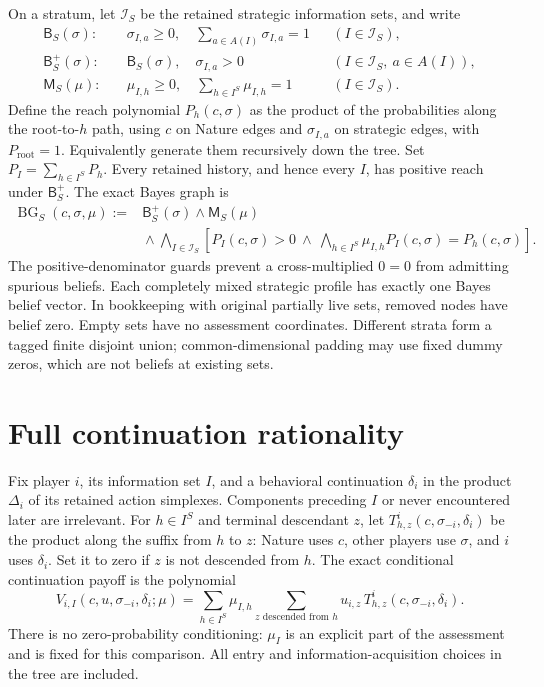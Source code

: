 \documentclass[11pt,a4paper]{article}
\numberwithin{equation}{section}
\theoremstyle{definition}
\DeclareMathOperator{\BG}{BG}
\begin{document}
On a stratum, let \(\mathcal I_S\) be the retained strategic information
sets, and write
\begin{align*}
 \mathsf B_S(\sigma):\quad&
   \sigma_{I,a}\ge0,\quad\sum_{a\in A(I)}\sigma_{I,a}=1
                    &&(I\in\mathcal I_S),\\
 \mathsf B_S^+(\sigma):\quad&
   \mathsf B_S(\sigma),\quad \sigma_{I,a}>0
                    &&(I\in\mathcal I_S,\ a\in A(I)),\\
 \mathsf M_S(\mu):\quad&
   \mu_{I,h}\ge0,\quad\sum_{h\in I^S}\mu_{I,h}=1
                    &&(I\in\mathcal I_S).
\end{align*}
Define the reach polynomial \(P_h(c,\sigma)\) as the product of
the probabilities along the root-to-\(h\) path, using \(c\) on Nature
edges and \(\sigma_{I,a}\) on strategic edges, with \(P_{\mathrm{root}}=1\).
Equivalently generate them recursively down the tree.
Set \(P_I=\sum_{h\in I^S}P_h\).
Every retained history, and hence every \(I\), has positive reach under
\(\mathsf B_S^+\). The exact Bayes graph is
\begin{equation}\label{eq:Bayes}
 \begin{split}
 \BG_S(c,\sigma,\mu):={}&
 \mathsf B_S^+(\sigma)\wedge\mathsf M_S(\mu)\\
 &{}\wedge\bigwedge_{I\in\mathcal I_S}
   \left[P_I(c,\sigma)>0\ \wedge\
    \bigwedge_{h\in I^S}\mu_{I,h}P_I(c,\sigma)=P_h(c,\sigma)\right].
 \end{split}
\end{equation}
The positive-denominator guards prevent a cross-multiplied \(0=0\)
from admitting spurious beliefs.
Each completely mixed strategic profile has exactly one Bayes belief
vector. In bookkeeping with original partially live sets, removed
nodes have belief zero. Empty sets have no assessment coordinates.
Different strata form a tagged finite disjoint union; common-dimensional
padding may use fixed dummy zeros, which are not beliefs at existing sets.

\section{Full continuation rationality}\label{sec:SR}
Fix player \(i\), its information set \(I\), and a behavioral continuation
\(\delta_i\) in the product \(\Delta_i\) of its retained action simplexes.
Components preceding \(I\) or never encountered later are irrelevant.
For \(h\in I^S\) and terminal descendant \(z\), let
\(T^i_{h,z}(c,\sigma_{-i},\delta_i)\) be the product along the suffix
from \(h\) to \(z\): Nature uses \(c\), other players use \(\sigma\),
and \(i\) uses \(\delta_i\).
Set it to zero if \(z\) is not descended from \(h\).
The exact conditional continuation payoff is the polynomial
\begin{equation}\label{eq:continuation}
 V_{i,I}(c,u,\sigma_{-i},\delta_i;\mu)
 =\sum_{h\in I^S}\mu_{I,h}
      \sum_{z\text{ descended from }h}
           u_{i,z}\,T^i_{h,z}(c,\sigma_{-i},\delta_i).
\end{equation}
There is no zero-probability conditioning: \(\mu_I\) is an explicit
part of the assessment and is fixed for this comparison.
All entry and information-acquisition choices in the tree are included.
\end{document}
